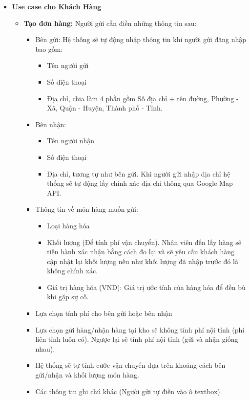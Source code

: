 	\begin{itemize}
		\item \textbf{Use case cho Khách Hàng}
		\begin{itemize}
			\item \textbf{Tạo đơn hàng:} Người gửi cần điền những thông tin sau: 
			\begin{itemize}
				\item Bên gửi: Hệ thống sẽ tự động nhập thông tin khi người gửi đăng nhập bao gồm:
				\begin{itemize}
					\item Tên người gửi
					\item Số điện thoại
					\item Địa chỉ, chia làm 4 phần gồm Số địa chỉ + tên đường, Phường - Xã, Quận - Huyện, Thành phố - Tỉnh. 
				\end{itemize}
				\item Bên nhận:
				\begin{itemize}
					\item Tên người nhận
					\item Số điện thoại
					\item Địa chỉ, tương tự như bên gửi. Khi người gửi nhập địa chỉ hệ thống sẽ tự động lấy chính xác địa chỉ thông qua Google Map API.
				\end{itemize}
				\item Thông tin về món hàng muốn gửi:
				\begin{itemize}
					\item Loại hàng hóa
					\item Khối lượng (Để tính phí vận chuyển). Nhân viên đến lấy hàng sẽ tiến hành xác nhận bằng cách đo lại và sẽ yêu cầu khách hàng cập nhật lại khối lượng nếu như khối lượng đã nhập trước đó là không chính xác.
					\item Giá trị hàng hóa (VND): Giá trị ước tính của hàng hóa để đền bù khi gặp sự cố.
					
				\end{itemize}
				\item Lựa chọn tính phí cho bên gửi hoặc bên nhận 
				\item Lựa chọn gửi hàng/nhận hàng tại kho sẽ không tính phí nội tỉnh (phí liên tỉnh luôn có). Ngược lại sẽ tính phí nội tỉnh (gửi và nhận giống nhau). 
				\item Hệ thống sẽ tự tính cước vận chuyển dựa trên khoảng cách bên gửi/nhận và khối lượng món hàng.
				\item Các thông tin ghi chú khác (Người gửi tự điền vào ô textbox).
			\end{itemize} 
				

\end{itemize}
\end{itemize}
